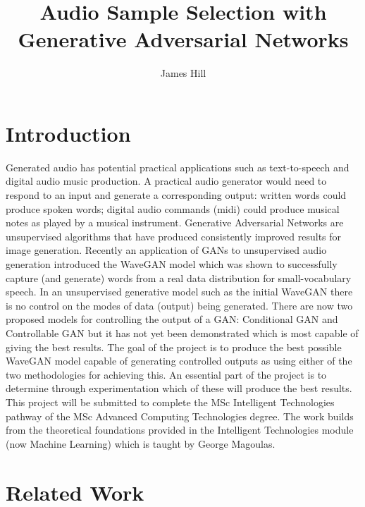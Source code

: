 \documentclass[a4paper, titlepage]{article}
\title{Audio Sample Selection with Generative Adversarial Networks}
\author{James Hill}
\date{}
\begin{document}
\maketitle
\tableofcontents

\newpage

\section{Introduction}

Generated audio has potential practical applications such as text-to-speech and digital audio music production.
A practical audio generator would need to respond to an input and generate a corresponding output: written words could produce spoken words; digital audio commands (midi) could produce musical notes as played by a musical instrument.
\newline
\newline
Generative Adversarial Networks \cite{2014arXiv1406.2661G} are unsupervised algorithms that have produced consistently improved results for image generation.
Recently an application of GANs to unsupervised audio generation introduced the WaveGAN model \cite{2018arXiv180204208D} which was shown to successfully capture (and generate) words from a real data distribution for small-vocabulary speech.
\newline
\newline
In an unsupervised generative model such as the initial WaveGAN there is no control on the modes of data (output) being generated.
There are now two proposed models for controlling the output of a GAN: Conditional GAN and Controllable GAN but it has not yet been demonstrated which is most capable of giving the best results.
\newline
\newline
The goal of the project is to produce the best possible WaveGAN model capable of generating controlled outputs as using either of the two methodologies for achieving this.
An essential part of the project is to determine through experimentation which of these will produce the best results.
\newline
\newline
This project will be submitted to complete the MSc Intelligent Technologies pathway of the MSc Advanced Computing Technologies degree.
The work builds from the theoretical foundations provided in the Intelligent Technologies module (now Machine Learning) which is taught by George Magoulas.

\section{Related Work}
\end{document}
